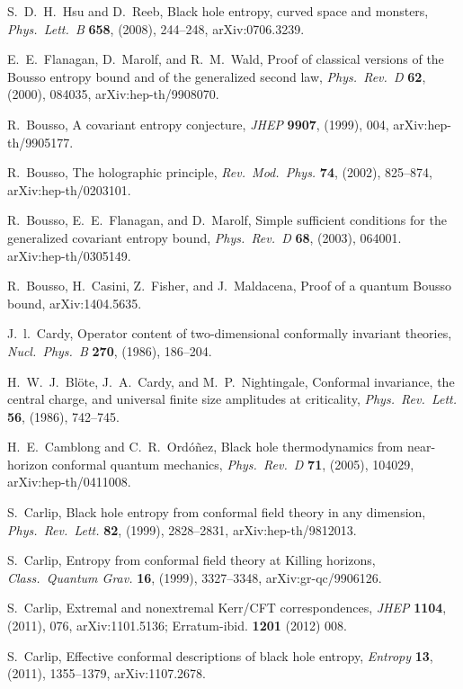 \documentclass[12pt]{article}
\begin{document}
\begin{thebibliography}{999}
 S.~D.~H.\ Hsu and D.\ Reeb, Black hole entropy, 
curved space and monsters, \emph{Phys.\ Lett.\ B} {\bf 658}, 
(2008), 244--248, arXiv:0706.3239. 

 E.~E.\ Flanagan, D.\ Marolf, and R.~M.\ Wald,
Proof of classical versions of the Bousso entropy bound and of the 
generalized second law, \emph{Phys.\ Rev.\ D} {\bf 62}, (2000),
084035, arXiv:hep-th/9908070.

 R.\ Bousso, A covariant entropy conjecture,
\emph{JHEP} {\bf 9907}, (1999), 004, arXiv:hep-th/9905177.

 R.\ Bousso, The holographic principle, 
\emph{Rev.\ Mod.\ Phys.} {\bf 74}, (2002),  825--874, 
arXiv:hep-th/0203101.

 R.\ Bousso, E.~E.\ Flanagan, and D.\ Marolf,
Simple sufficient conditions for the generalized covariant 
entropy bound, \emph{Phys.\ Rev.\ D} {\bf 68}, (2003), 064001.
arXiv:hep-th/0305149.

 R.\ Bousso, H.\ Casini, Z.\ Fisher, and 
J.\ Maldacena, Proof of a quantum Bousso bound, arXiv:1404.5635.

 J.~l.\ Cardy, Operator content of two-dimensional 
conformally invariant theories, \emph{Nucl.\ Phys.\ B} {\bf 270}, 
(1986), 186--204.

  H.~W.~J.\ Bl{\"o}te, J.~A.\ Cardy, and M.~P.\ 
Nightingale, Conformal invariance, the central charge, and 
universal finite size amplitudes at criticality, \emph{Phys.\ Rev.\ 
Lett.} {\bf 56}, (1986), 742--745.

 H.~E.\ Camblong and C.~R.\ Ord{\'o}{\~n}ez, 
Black hole thermodynamics from near-horizon conformal quantum 
mechanics, \emph{Phys.\ Rev.\ D} {\bf 71}, (2005), 104029,
arXiv:hep-th/0411008.

 S.\ Carlip, Black hole entropy from conformal 
field theory in any dimension, \emph{Phys.\ Rev.\ Lett.} {\bf 82}, 
(1999), 2828--2831, arXiv:hep-th/9812013.

 S.\ Carlip, Entropy from conformal field 
theory at Killing horizons, \emph{Class.\ Quantum Grav.} {\bf 16}, 
(1999), 3327--3348, arXiv:gr-qc/9906126.

 S.\ Carlip, Extremal and nonextremal Kerr/CFT 
correspondences, \emph{JHEP} {\bf 1104}, (2011), 076, 
arXiv:1101.5136;  Erratum-ibid. {\bf 1201} (2012) 008.

 S.\ Carlip, Effective conformal descriptions
of black hole entropy, \emph{Entropy} {\bf 13}, (2011), 
1355--1379, arXiv:1107.2678. 


\end{thebibliography}
\end{document}
